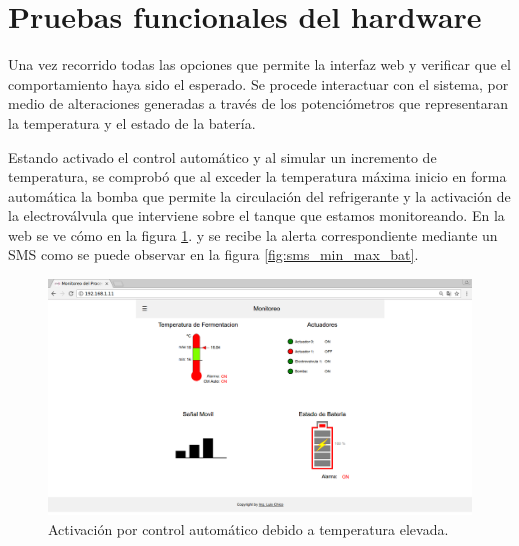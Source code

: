 \section{Pruebas funcionales del hardware}
\label{sec:pruebasHW}

Una vez recorrido todas las opciones que permite la interfaz web y verificar que el comportamiento haya sido el esperado. Se procede interactuar con el sistema, por medio de alteraciones generadas a través de los potenciómetros que representaran la temperatura y el estado de la batería.

Estando activado el control automático y al simular un incremento de temperatura, se comprobó que al exceder la temperatura máxima inicio en forma automática la bomba que permite la circulación del refrigerante y la activación de la electroválvula que interviene sobre el tanque que estamos monitoreando. En la web se ve cómo en la figura \ref{fig:auto_control_active}. y se recibe la alerta correspondiente mediante un SMS como se puede observar en la figura \ref{fig:sms_min_max_bat}.

\begin{figure}[h]
  \centering
  \includegraphics[scale=.25]{./Figures/auto_control_active.png}
  \caption{Activación por control automático debido a temperatura elevada.}
  \label{fig:auto_control_active}
\end{figure}


